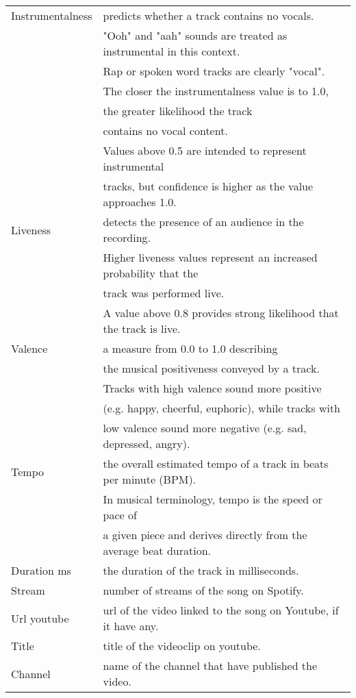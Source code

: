 \documentclass[12pt]{article}
\theoremstyle{remark}
\begin{document}
\begin{table}

		\begin{tabular}{l|l}\hline
Instrumentalness & predicts whether a track contains no vocals. \\
& "Ooh" and "aah" sounds are treated as instrumental in this context. \\
& Rap or spoken word tracks are clearly "vocal". \\
& The closer the instrumentalness value is to 1.0,\\
& the greater likelihood the track \\
& contains no vocal content. \\
&  Values above 0.5 are intended to represent instrumental \\
& tracks, but confidence is higher as the value approaches 1.0.\\
Liveness & detects the presence of an audience in the recording. \\
& Higher liveness values represent an increased probability that the \\
& track was performed live.\\
& A value above 0.8 provides strong likelihood that the track is live.\\
Valence & a measure from 0.0 to 1.0 describing \\
& the musical positiveness conveyed by a track.\\
& Tracks with high valence sound more positive \\
& (e.g. happy, cheerful, euphoric), while tracks with \\
& low valence sound more negative (e.g. sad, depressed, angry).\\
Tempo & the overall estimated tempo of a track in beats per minute (BPM).\\
& In musical terminology, tempo is the speed or pace of \\
& a given piece and derives directly from the average beat duration.\\
Duration ms & the duration of the track in milliseconds.\\
Stream & number of streams of the song on Spotify.\\
Url youtube & url of the video linked to the song on Youtube, if it have any.\\
Title & title of the videoclip on youtube.\\
Channel & name of the channel that have published the video.\\

\end{tabular}
\end{table}
\end{document}
